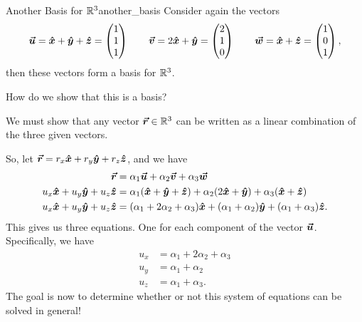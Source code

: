         \begin{ex}{Another Basis for $\mathbb{R}^3$}{another_basis}
        Consider again the vectors
            \[
            \boldsymbol{\boldsymbol{\vec{u}}} = \boldsymbol{\hat{x}} + \boldsymbol{\hat{y}} + \boldsymbol{\hat{z}} = \begin{pmatrix} 1 \\ 1 \\ 1\end{pmatrix} \qquad \boldsymbol{\boldsymbol{\vec{v}}} = 2\boldsymbol{\hat{x}} + \boldsymbol{\hat{y}} = \begin{pmatrix} 2 \\ 1 \\ 0 \end{pmatrix} \qquad \boldsymbol{\boldsymbol{\vec{w}}} = \boldsymbol{\hat{x}} + \boldsymbol{\hat{z}} = \begin{pmatrix} 1 \\ 0 \\ 1 \end{pmatrix},
            \]
            then these vectors form a basis for $\mathbb{R}^3$. 
            \begin{question}
            How do we show that this is a basis?
            \end{question}
            \begin{answer}
            We must show that any vector $\boldsymbol{\vec{r}} \in \mathbb{R}^3$ can be written as a linear combination of the three given vectors.
            \end{answer}
            So, let $\boldsymbol{\vec{r}} = r_x\boldsymbol{\hat{x}} + r_y\boldsymbol{\hat{y}} + r_z \boldsymbol{\hat{z}}$, and we have
            \begin{align*}
                \boldsymbol{\vec{r}} &= \alpha_1 \boldsymbol{\boldsymbol{\vec{u}}} + \alpha_2 \boldsymbol{\boldsymbol{\vec{v}}} + \alpha_3 \boldsymbol{\boldsymbol{\vec{w}}}\\
                u_x \boldsymbol{\hat{x}} + u_y \boldsymbol{\hat{y}} + u_z \boldsymbol{\hat{z}} &= \alpha_1 (\boldsymbol{\hat{x}} + \boldsymbol{\hat{y}} + \boldsymbol{\hat{z}}) + \alpha_2 (2\boldsymbol{\hat{x}} + \boldsymbol{\hat{y}}) + \alpha_3 (\boldsymbol{\hat{x}} + \boldsymbol{\hat{z}})\\
                u_x \boldsymbol{\hat{x}} + u_y \boldsymbol{\hat{y}} + u_z \boldsymbol{\hat{z}} &= (\alpha_1 +2\alpha_2 + \alpha_3)\boldsymbol{\hat{x}} + (\alpha_1 +\alpha_2)\boldsymbol{\hat{y}} + (\alpha_1 +\alpha_3)\boldsymbol{\hat{z}}.
            \end{align*}
            This gives us three equations. One for each component of the vector $\boldsymbol{\boldsymbol{\vec{u}}}$. Specifically, we have
            \begin{align*}
                u_x &= \alpha_1 + 2\alpha_2 + \alpha_3 \\
                u_y &= \alpha_1 + \alpha_2\\
                u_z &= \alpha_1 + \alpha_3.
            \end{align*}
            The goal is now to determine whether or not this system of equations can be solved in general!
        \end{ex}
        
